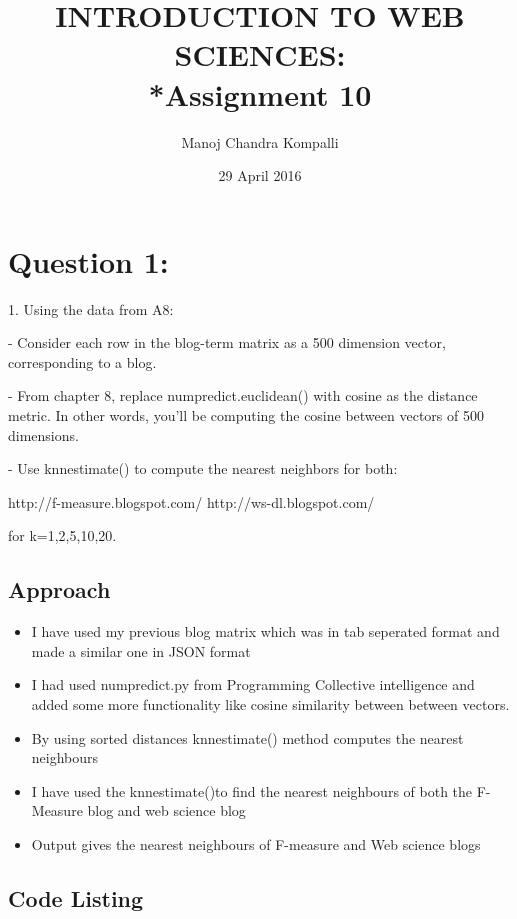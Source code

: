 \documentclass[12pt]{article}
\begin{document}
\begin{titlepage}
\title{INTRODUCTION TO WEB SCIENCES:\\*Assignment 10}
\author{Manoj Chandra Kompalli}
\date{29 April 2016}
\maketitle
\end{titlepage}

\tableofcontents
\newpage

\section{Question 1:  }
1.  Using the data from A8:

- Consider each row in the blog-term matrix as a 500 dimension vector, 
corresponding to a blog.  

- From chapter 8, replace numpredict.euclidean() with cosine as the 
distance metric.  In other words, you'll be computing the cosine between
vectors of 500 dimensions.  

- Use knnestimate() to compute the nearest neighbors for both:

http://f-measure.blogspot.com/
http://ws-dl.blogspot.com/

for k={1,2,5,10,20}.


\subsection{Approach}
\begin{itemize} 
\item I have used my previous blog matrix which was in tab seperated format and made a similar one in JSON format 
\item I had used numpredict.py from Programming Collective intelligence and added some more functionality like cosine similarity between between vectors.
\item By using sorted distances knnestimate() method computes the nearest neighbours 
\item I have used the knnestimate()to find the nearest neighbours of both the F-Measure blog and web science blog 
\item Output gives the nearest neighbours of F-measure and Web science blogs 

 
\end{itemize}
 \newpage

\subsection{Code Listing}
\end{document}
